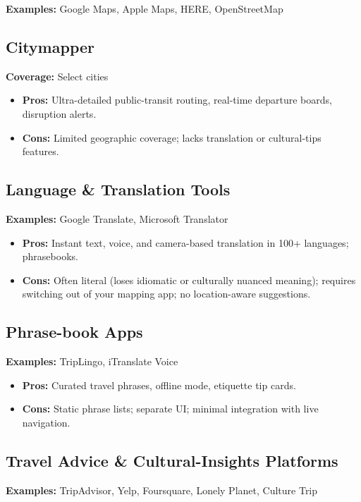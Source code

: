 \textbf{Examples:} Google Maps, Apple Maps, HERE, OpenStreetMap


\subsection{Citymapper}
\textbf{Coverage:} Select cities

\begin{itemize}
\item \textbf{Pros:} Ultra-detailed public-transit routing, real-time departure boards, disruption alerts.
\item \textbf{Cons:} Limited geographic coverage; lacks translation or cultural-tips features.
\end{itemize}

\subsection{Language \& Translation Tools}
\textbf{Examples:} Google Translate, Microsoft Translator

\begin{itemize}
\item \textbf{Pros:} Instant text, voice, and camera-based translation in 100+ languages; phrasebooks.
\item \textbf{Cons:} Often literal (loses idiomatic or culturally nuanced meaning); requires switching out of your mapping app; no location-aware suggestions.
\end{itemize}

\subsection{Phrase-book Apps}
\textbf{Examples:} TripLingo, iTranslate Voice

\begin{itemize}
\item \textbf{Pros:} Curated travel phrases, offline mode, etiquette tip cards.
\item \textbf{Cons:} Static phrase lists; separate UI; minimal integration with live navigation.
\end{itemize}

\subsection{Travel Advice \& Cultural-Insights Platforms}
\textbf{Examples:} TripAdvisor, Yelp, Foursquare, Lonely Planet, Culture Trip

